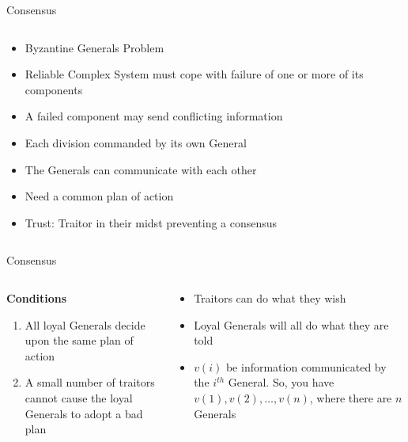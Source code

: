 \documentclass[pdf,table]{beamer}
\begin{document}
\begin{frame}{Consensus}
	\begin{columns}[T]
		\begin{column}{0.49\textwidth}
		\begin{itemize}
		\item Byzantine Generals Problem \cite{lamport1982byzantine}
		\item Reliable Complex System must cope with failure of one or more of its components
		\item A failed component may send conflicting information
		\item Each division commanded by its own General
		\item The Generals can communicate with each other
		\item Need a common plan of action
		\item Trust: Traitor in their midst preventing a consensus
		\end{itemize}
		\end{column}
		\begin{column}{0.49\textwidth}
		\end{column}
	\end{columns}
\end{frame}

\begin{frame}{Consensus}
	\begin{columns}[T]
		\begin{column}{0.49\textwidth}
		{\bf Conditions}
		\begin{enumerate}
			\item All loyal Generals decide upon the same plan of action
			\item A small number of traitors cannot cause the loyal Generals to adopt a bad plan
		\end{enumerate}
		\end{column}
		\begin{column}{0.5\textwidth}
			\begin{itemize}
				\item Traitors can do what they wish
				\item Loyal Generals will all do what they are told
				\item $v(i)$ be information communicated by the $i^{th}$ General. So, you have $v(1),v(2),\ldots,v(n)$, where there are $n$ Generals
			\end{itemize}
		\end{column}
	\end{columns}
\end{frame}
\end{document}
